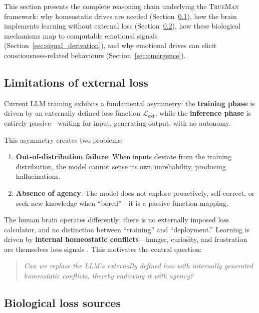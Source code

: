 \documentclass[pdflatex,sn-mathphys-num]{sn-jnl}
\newcommand{\TrueMan}{\textsc{TrueMan}}
\theoremstyle{thmstyleone}%
\theoremstyle{thmstyletwo}%
\theoremstyle{thmstylethree}%
\begin{document}
This section presents the complete reasoning chain underlying the \TrueMan{} framework: why homeostatic drives are needed (Section~\ref{sec:motivation}), how the brain implements learning without external loss (Section~\ref{sec:bio_translation}), how these biological mechanisms map to computable emotional signals (Section~\ref{sec:signal_derivation}), and why emotional drives can elicit consciousness-related behaviours (Section~\ref{sec:emergence}).

\subsection{Limitations of external loss}\label{sec:motivation}

Current LLM training exhibits a fundamental asymmetry: the \textbf{training phase} is driven by an externally defined loss function $\mathcal{L}_{\text{ext}}$, while the \textbf{inference phase} is entirely passive---waiting for input, generating output, with no autonomy.

This asymmetry creates two problems:
\begin{enumerate}[leftmargin=2em]
    \item \textbf{Out-of-distribution failure}: When inputs deviate from the training distribution, the model cannot sense its own unreliability, producing hallucinations.
    \item \textbf{Absence of agency}: The model does not explore proactively, self-correct, or seek new knowledge when ``bored''---it is a passive function mapping.
\end{enumerate}

The human brain operates differently: there is no externally imposed loss calculator, and no distinction between ``training'' and ``deployment.'' Learning is driven by \textbf{internal homeostatic conflicts}---hunger, curiosity, and frustration are themselves loss signals \cite{friston2019free}. This motivates the central question:

\begin{quote}
\textit{Can we replace the LLM's externally defined loss with internally generated homeostatic conflicts, thereby endowing it with agency?}
\end{quote}

\subsection{Biological loss sources}\label{sec:bio_translation}
\end{document}
